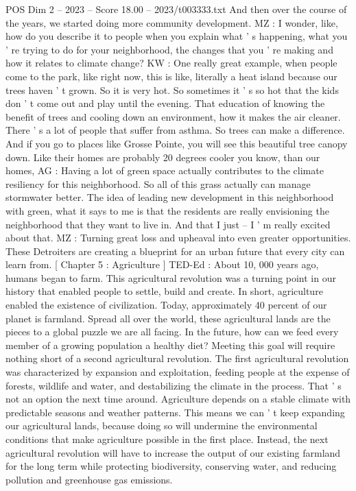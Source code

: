 \begin{textsample}{POS Dim 2 – 2023 – Score 18.00 – 2023/t003333.txt}
And then over the course of the years, we started doing more community development.
MZ : I wonder, like, how do you describe it to people when you explain what ' s happening, what you ' re trying to do for your neighborhood, the changes that you ' re making and how it relates to climate change?
KW : One really great example, when people come to the park, like right now, this is like, literally a heat island because our trees haven ' t grown.
So it is very hot.
So sometimes it ' s so hot that the kids don ' t come out and play until the evening.
That education of knowing the benefit of trees and cooling down an environment, how it makes the air cleaner.
There ' s a lot of people that suffer from asthma.
So trees can make a difference.
And if you go to places like Grosse Pointe, you will see this beautiful tree canopy down.
Like their homes are probably 20 degrees cooler you know, than our homes, AG : Having a lot of green space actually contributes to the climate resiliency for this neighborhood.
So all of this grass actually can manage stormwater better.
The idea of leading new development in this neighborhood with green, what it says to me is that the residents are really envisioning the neighborhood that they want to live in.
And that I just -- I ' m really excited about that.
MZ : Turning great loss and upheaval into even greater opportunities.
These Detroiters are creating a blueprint for an urban future that every city can learn from. [ Chapter 5 : Agriculture ] TED-Ed : About 10, 000 years ago, humans began to farm.
This agricultural revolution was a turning point in our history that enabled people to settle, build and create.
In short, agriculture enabled the existence of civilization.
Today, approximately 40 percent of our planet is farmland.
Spread all over the world, these agricultural lands are the pieces to a global puzzle we are all facing.
In the future, how can we feed every member of a growing population a healthy diet?
Meeting this goal will require nothing short of a second agricultural revolution.
The first agricultural revolution was characterized by expansion and exploitation, feeding people at the expense of forests, wildlife and water, and destabilizing the climate in the process.
That ' s not an option the next time around.
Agriculture depends on a stable climate with predictable seasons and weather patterns.
This means we can ' t keep expanding our agricultural lands, because doing so will undermine the environmental conditions that make agriculture possible in the first place.
Instead, the next agricultural revolution will have to increase the output of our existing farmland for the long term while protecting biodiversity, conserving water, and reducing pollution and greenhouse gas emissions.

\end{textsample}
